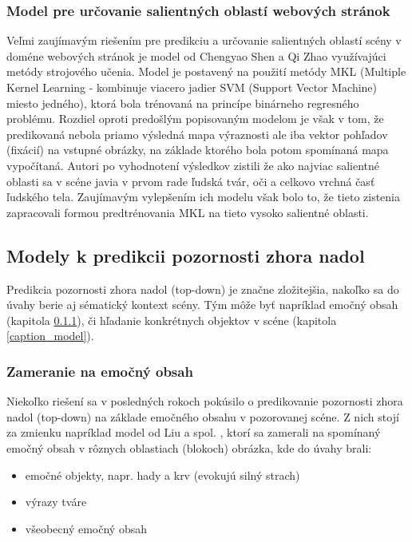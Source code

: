 \subsubsection{Model pre určovanie salientných oblastí webových stránok}

Veľmi zaujímavým riešením pre predikciu a určovanie salientných oblastí scény v doméne webových stránok je model od Chengyao Shen a Qi Zhao\cite{Saliency} využívajúci metódy strojového učenia. Model je postavený na použití metódy MKL (Multiple Kernel Learning - kombinuje viacero jadier SVM (Support Vector Machine) miesto jedného), ktorá bola 
trénovaná na princípe binárneho regresného problému. Rozdiel oproti predošlým popisovaným modelom je však v tom, že predikovaná nebola priamo výsledná mapa výraznosti ale iba vektor pohľadov (fixácií) na vstupné obrázky, na základe ktorého bola potom spomínaná mapa vypočítaná. Autori po vyhodnotení výsledkov zistili že ako najviac salientné oblasti sa v scéne javia v prvom rade ľudská tvár, oči a celkovo vrchná časť ľudského tela. Zaujímavým vylepšením ich modelu však bolo to, že tieto zistenia zapracovali formou predtrénovania MKL na tieto vysoko salientné oblasti. 


\subsection{Modely k predikcii pozornosti zhora nadol}
\label{top-down_modely}
Predikcia pozornosti zhora nadol (top-down) je značne zložitejšia, nakoľko sa do úvahy berie aj sématický kontext scény. Tým môže byť napríklad emočný obsah (kapitola \ref{emotion_content}), či hľadanie konkrétnych objektov v scéne (kapitola \ref{caption_model}).


\subsubsection{Zameranie na emočný obsah}
\label{emotion_content}
Niekoľko riešení sa v posledných rokoch pokúsilo o predikovanie pozornosti zhora nadol (top-down) na základe emočného obsahu v pozorovanej scéne. Z nich stojí za zmienku napríklad model od Liu a spol. \cite{liu2016improving}, ktorí sa zamerali na spomínaný emočný obsah v rôznych oblastiach (blokoch) obrázka, kde do úvahy brali:
\begin{itemize}
	\item emočné objekty, napr. hady a krv (evokujú silný strach)
	\item výrazy tváre
	\item všeobecný emočný obsah
\end{itemize}

